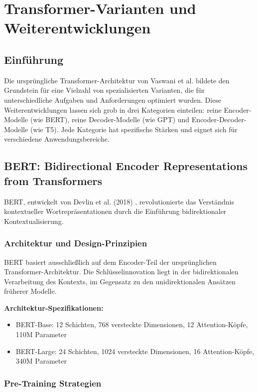\chapter{Transformer-Varianten und Weiterentwicklungen}
\label{ch:transformer_variants}

\section{Einführung}

Die ursprüngliche Transformer-Architektur von Vaswani et al. bildete den Grundstein für eine Vielzahl von spezialisierten Varianten, die für unterschiedliche Aufgaben und Anforderungen optimiert wurden. Diese Weiterentwicklungen lassen sich grob in drei Kategorien einteilen: reine Encoder-Modelle (wie BERT), reine Decoder-Modelle (wie GPT) und Encoder-Decoder-Modelle (wie T5). Jede Kategorie hat spezifische Stärken und eignet sich für verschiedene Anwendungsbereiche.

\section{BERT: Bidirectional Encoder Representations from Transformers}

BERT, entwickelt von Devlin et al. (2018) \cite{devlin2018bert}, revolutionierte das Verständnis kontextueller Wortrepräsentationen durch die Einführung bidirektionaler Kontextualisierung.

\subsection{Architektur und Design-Prinzipien}

BERT basiert ausschließlich auf dem Encoder-Teil der ursprünglichen Transformer-Architektur. Die Schlüsselinnovation liegt in der bidirektionalen Verarbeitung des Kontexts, im Gegensatz zu den unidirektionalen Ansätzen früherer Modelle.

\textbf{Architektur-Spezifikationen:}
\begin{itemize}
    \item BERT-Base: 12 Schichten, 768 versteckte Dimensionen, 12 Attention-Köpfe, 110M Parameter
    \item BERT-Large: 24 Schichten, 1024 versteckte Dimensionen, 16 Attention-Köpfe, 340M Parameter
\end{itemize}

\subsection{Pre-Training Strategien}


